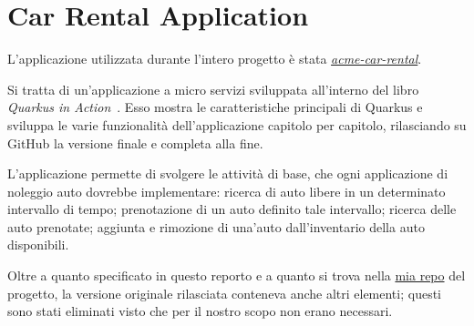 \chapter{Car Rental Application}
L'applicazione utilizzata durante l'intero progetto è stata \href{https://github.com/xstefank/quarkus-in-action}{\textit{acme-car-rental}}.

Si tratta di un'applicazione a micro servizi sviluppata all'interno del libro \textit{Quarkus in Action}~\cite{quarkusinaction}. Esso mostra le caratteristiche principali di Quarkus e sviluppa le varie funzionalità dell'applicazione capitolo per capitolo, rilasciando su GitHub la versione finale e completa alla fine.

L'applicazione permette di svolgere le attività di base, che ogni applicazione di noleggio auto dovrebbe implementare: ricerca di auto libere in un determinato intervallo di tempo; prenotazione di un auto definito tale intervallo; ricerca delle auto prenotate; aggiunta e rimozione di una'auto dall'inventario della auto disponibili.

\myskip

Oltre a quanto specificato in questo reporto e a quanto si trova nella \href{https://github.com/edoardosarri24/quarkus-car-rental}{mia repo} del progetto, la versione originale rilasciata conteneva anche altri elementi; questi sono stati eliminati visto che per il nostro scopo non erano necessari.

